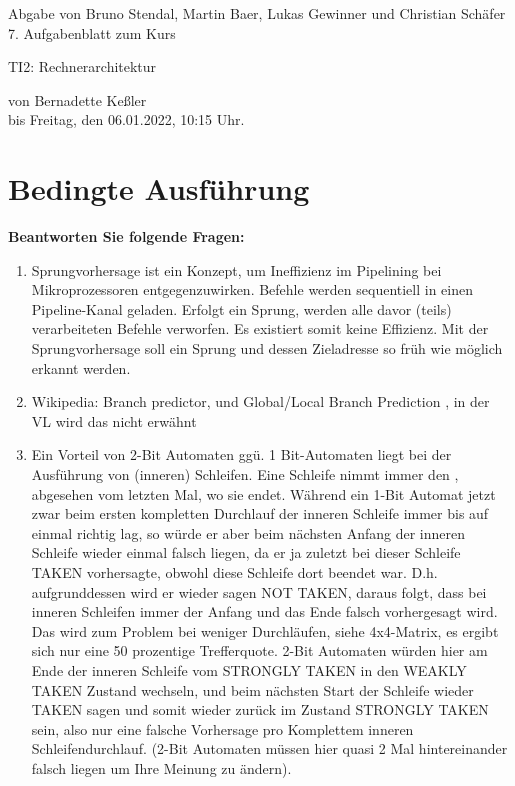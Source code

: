 \documentclass[11pt]{article}
\newcommand{\VORLESUNG}{TI2: Rechnerarchitektur}
\newcommand{\STUDENTS}{Bruno Stendal, Martin Baer, Lukas Gewinner und Christian Schäfer}
\newcommand{\STAFF}{Bernadette Keßler}
\newcommand{\ASSIGNMENT}{7}
\newcommand{\DELIVER}{Freitag, den 06.01.2022, 10:15 Uhr}
\newcommand{\aufgabe}[1]{\item{\bf #1}}
\begin{document}
\ofoot{\pagemark}
\begin{center}
    Abgabe von \STUDENTS{}\\
 \ASSIGNMENT{}. Aufgabenblatt  zum Kurs 
\vspace*{0.2cm}

{\Large \VORLESUNG{}}

{\small von \STAFF{} \\ bis \DELIVER{}.}
\vspace*{0.5cm}\\
\end{center}
\section{Bedingte Ausführung}
\aufgabe{Beantworten Sie folgende Fragen:}
\begin{enumerate}
    \item Sprungvorhersage ist ein Konzept, um Ineffizienz im Pipelining bei Mikroprozessoren entgegenzuwirken. Befehle werden sequentiell in einen Pipeline-Kanal geladen. Erfolgt ein Sprung, werden alle davor (teils) verarbeiteten Befehle verworfen. Es existiert somit keine Effizienz. Mit der Sprungvorhersage soll ein Sprung und dessen Zieladresse so früh wie möglich erkannt werden.
    \item Wikipedia: Branch predictor, und Global/Local Branch Prediction , in der VL wird das nicht erwähnt
    \item Ein Vorteil von 2-Bit Automaten ggü. 1 Bit-Automaten liegt bei der Ausführung von (inneren) Schleifen. Eine Schleife nimmt immer den , abgesehen vom letzten Mal, wo sie endet. Während ein 1-Bit Automat jetzt zwar beim ersten kompletten Durchlauf der inneren Schleife immer bis auf einmal richtig lag, so würde er aber beim nächsten Anfang der inneren Schleife wieder einmal falsch liegen, da er ja zuletzt bei dieser Schleife TAKEN vorhersagte, obwohl diese Schleife dort beendet war. D.h. aufgrunddessen wird er wieder sagen NOT TAKEN, daraus folgt, dass bei inneren Schleifen immer der Anfang und das Ende falsch vorhergesagt wird. Das wird zum Problem bei weniger Durchläufen, siehe 4x4-Matrix, es ergibt sich nur eine 50 prozentige Trefferquote. 2-Bit Automaten würden hier am Ende der inneren Schleife vom STRONGLY TAKEN in den WEAKLY TAKEN Zustand wechseln, und beim nächsten Start der Schleife wieder TAKEN sagen und somit wieder zurück im Zustand STRONGLY TAKEN sein, also nur eine falsche Vorhersage pro Komplettem inneren Schleifendurchlauf. (2-Bit Automaten müssen hier quasi 2 Mal hintereinander falsch liegen um Ihre Meinung zu ändern).

\end{enumerate}
\end{document}
